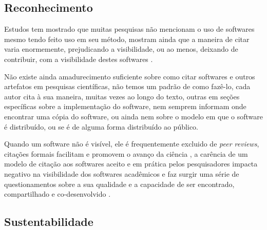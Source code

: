 \subsection{Reconhecimento}


Estudos tem mostrado que muitas pesquisas não mencionam o uso de softwares
mesmo tendo feito uso em seu método, mostram ainda que a maneira de citar
varia enormemente, prejudicando a visibilidade, ou ao menos, deixando de
contribuir, com a visibilidade destes softwares \cite{howison2016software}.

Não existe ainda amadurecimento suficiente sobre como citar softwares e
outros artefatos em pesquisas científicas, não temos um padrão de como fazê-lo,
cada autor cita à sua maneira, muitas vezes ao longo do texto, outras em seções
específicas sobre a implementação do software, nem semprem informam onde
encontrar uma cópia do software, ou ainda nem sobre o modelo em que o software
é distribuído, ou se é de alguma forma distribuído ao público.


Quando um software não é visível, ele é frequentemente excluido de {\it peer
reviews}, citações formais facilitam e promovem o avanço da ciência \cite{allen2014credit}, a carência
de um modelo de citação aos softwares aceito e em prática pelos pesquisadores
impacta negativo na visibilidade dos softwares acadêmicos e faz surgir uma
série de questionamentos sobre a sua qualidade e a capacidade de ser
encontrado, compartilhado e co-desenvolvido \cite{howison2013,
katz2014transitive} \cite{howison2016software}.


\subsection{Sustentabilidade} \label{sustentabilidade}

